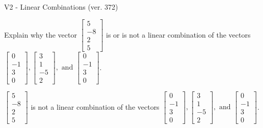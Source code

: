 \begin{exercise}
  \begin{exerciseTitle}V2 - Linear Combinations (ver. 372)\end{exerciseTitle}
  \begin{exerciseStatement}
    Explain why the vector \(\left[\begin{array}{c}
5 \\
-8 \\
2 \\
5
\end{array}\right]\)  is or is not a linear 
	combination of the vectors \(\left[\begin{array}{c}
0 \\
-1 \\
3 \\
0
\end{array}\right] , \left[\begin{array}{c}
3 \\
1 \\
-5 \\
2
\end{array}\right] , \text{ and } \left[\begin{array}{c}
0 \\
-1 \\
3 \\
0
\end{array}\right]\).
	


  \end{exerciseStatement}
  \begin{exerciseAnswer}
   \(\left[\begin{array}{c}
5 \\
-8 \\
2 \\
5
\end{array}\right]\) 
  	 is not  
	a linear combination of the vectors \(\left[\begin{array}{c}
0 \\
-1 \\
3 \\
0
\end{array}\right] , \left[\begin{array}{c}
3 \\
1 \\
-5 \\
2
\end{array}\right] , \text{ and } \left[\begin{array}{c}
0 \\
-1 \\
3 \\
0
\end{array}\right]\).

	
  


  \end{exerciseAnswer}
\end{exercise}